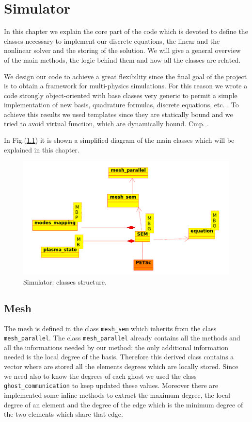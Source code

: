 \chapter{Simulator}\label{ch:simulator}
In this chapter we explain the core part of the code which is devoted to define the classes necessary to implement our discrete equations, the linear and the nonlinear solver and the storing of the solution. We will give a general overview of the main methods, the logic behind them and how all the classes are related.

We design our code to achieve a great flexibility since the final goal of the project is to obtain a framework for multi-physics simulations. For this reason we wrote a code strongly object-oriented with base classes very generic to permit a simple implementation of new basis, quadrature formulas, discrete equations, etc. . To achieve this results we used templates since they are statically bound and we tried to avoid virtual function, which are dynamically bound. Cmp. \cite{cpp_primer}.

In Fig.(\ref{fig:sem_diagram}) it is shown a simplified diagram of the main classes which will be explained in this chapter.

\begin{figure}
\centering
\includegraphics[scale=0.3]{images/sem_diagram.png}
\caption{Simulator: classes structure.}\label{fig:sem_diagram}
\end{figure}

\section{Mesh}\label{sec:mesh}
The mesh is defined in the class \verb|mesh_sem| which inherits from the class \verb|mesh_parallel|. The class \verb|mesh_parallel| already contains all the methods and all the informations needed by our method; the only additional information needed is the local degree of the basis. Therefore this derived class contains a vector where are stored all the elements degrees which are locally stored. Since we need also to know the degrees of each ghost we used the class \verb|ghost_communication| to keep updated these values. Moreover there are implemented some inline methods to extract the maximum degree, the local degree of an element and the degree of the edge which is the minimum degree of the two elements which share that edge.

